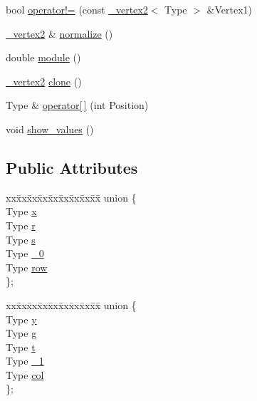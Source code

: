 \begin{DoxyCompactItemize}
\item 
bool \hyperlink{class__vertex2_abd28310390cfac783f29354a0ea0a8d3}{operator!=} (const \hyperlink{class__vertex2}{\+\_\+vertex2}$<$ Type $>$ \&Vertex1)
\item 
\hyperlink{class__vertex2}{\+\_\+vertex2} \& \hyperlink{class__vertex2_a300c0eeffd16df52f5a0990a1c086562}{normalize} ()
\item 
double \hyperlink{class__vertex2_ab19da68cecb3e4316edba46c2114a63b}{module} ()
\item 
\hyperlink{class__vertex2}{\+\_\+vertex2} \hyperlink{class__vertex2_ac00409cafb646e6cba805a7759d7db69}{clone} ()
\item 
Type \& \hyperlink{class__vertex2_a0fe2648c8afb5db0202af70f1d94bdb7}{operator\mbox{[}$\,$\mbox{]}} (int Position)
\item 
void \hyperlink{class__vertex2_a80da2494e943c19cc1e5f68191d455f5}{show\+\_\+values} ()
\end{DoxyCompactItemize}
\subsection*{Public Attributes}
\begin{DoxyCompactItemize}
\item 
\begin{tabbing}
xx\=xx\=xx\=xx\=xx\=xx\=xx\=xx\=xx\=\kill
union \{\\
\>Type \hyperlink{class__vertex2_a34050e835b9dafb02d5a61381bbaa434}{x}\\
\>Type \hyperlink{class__vertex2_a5a404037c59e0d4c2af8ba301e006cef}{r}\\
\>Type \hyperlink{class__vertex2_a4d6ed656629478ac2f367bec00589ec0}{s}\\
\>Type \hyperlink{class__vertex2_aba4452e10ea646649c3fd6c9cec1c89e}{\_0}\\
\>Type \hyperlink{class__vertex2_aa0d662a46c73e4c737fe9c09b54412c5}{row}\\
\}; \\

\end{tabbing}\item 
\begin{tabbing}
xx\=xx\=xx\=xx\=xx\=xx\=xx\=xx\=xx\=\kill
union \{\\
\>Type \hyperlink{class__vertex2_a4988efe986242839b52ce5c91889325e}{y}\\
\>Type \hyperlink{class__vertex2_aefb25eeec2261091016c3cfe508fdaaa}{g}\\
\>Type \hyperlink{class__vertex2_a64f0152747b02f799880ee51111f6316}{t}\\
\>Type \hyperlink{class__vertex2_a2f4d1d0369130356ebdf797b6da78bb8}{\_1}\\
\>Type \hyperlink{class__vertex2_a522c14fc32a2228789325db485217eeb}{col}\\
\}; \\

\end{tabbing}\end{DoxyCompactItemize}


